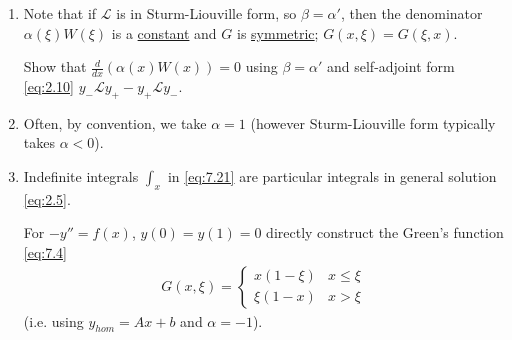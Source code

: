 \begin{note}
	\begin{enumerate}
		\item Note that if $\mathcal L$ is in Sturm-Liouville form, so $\beta = \alpha'$, then the denominator $\alpha(\xi)W(\xi)$ is a \underline{constant} and $G$ is \underline{symmetric}; $G(x,\xi) = G(\xi,x)$.
		\begin{exercise}
			Show that $\frac{d }{d x} (\alpha(x) W(x)) = 0$ using $\beta = \alpha'$ and self-adjoint form \cref{eq:2.10} $y_- \mathcal{L} y_+ - y_+ \mathcal{L} y_-$.
		\end{exercise} 
		\item Often, by convention, we take $\alpha = 1$ (however Sturm-Liouville form typically takes $\alpha < 0$).
		\item  Indefinite integrals $\int_x$ in \cref{eq:7.21} are particular integrals in general solution \cref{eq:2.5}.
		\begin{exercise}
			For $-y'' = f(x)$, $y(0) = y(1) = 0$ directly construct the Green's function \cref{eq:7.4}
			\begin{align*}
				G(x, \xi) = \begin{cases}
					x (1 - \xi) & x \leq \xi \\
					\xi (1 - x) & x > \xi
				\end{cases} 
			\end{align*} 
			(i.e. using $y_{hom} = Ax + b$ and $\alpha = -1$).
		\end{exercise} 
	\end{enumerate} 
\end{note} 

